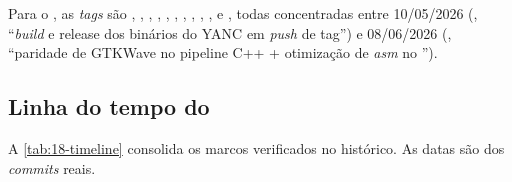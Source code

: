 Para o , as \emph{tags} são , , ,
, , , , , ,
,  e , todas concentradas entre 10/05/2026
(, \enquote{\emph{build} e release dos binários do YANC em \emph{push}
de tag}) e 08/06/2026 (, \enquote{paridade de GTKWave no pipeline
C++ + otimização de \emph{asm} no }).

\subsection{Linha do tempo do }
\label{sub:18-timeline-aurora}

A \autoref{tab:18-timeline} consolida os marcos verificados no histórico. As
datas são dos \emph{commits} reais.


